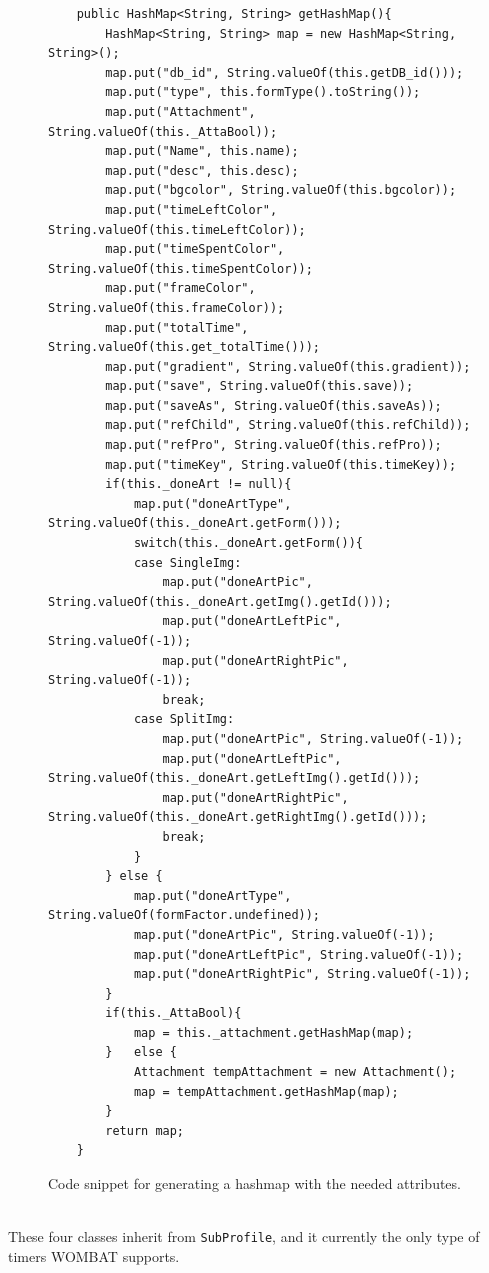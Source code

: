 \begin{description}
	\begin{figure}[H]
\begin{lstlisting}
	public HashMap<String, String> getHashMap(){
		HashMap<String, String> map = new HashMap<String, String>();
		map.put("db_id", String.valueOf(this.getDB_id()));
		map.put("type", this.formType().toString());		
		map.put("Attachment", String.valueOf(this._AttaBool));		
		map.put("Name", this.name);		
		map.put("desc", this.desc);		
		map.put("bgcolor", String.valueOf(this.bgcolor));		
		map.put("timeLeftColor", String.valueOf(this.timeLeftColor));		
		map.put("timeSpentColor", String.valueOf(this.timeSpentColor));		
		map.put("frameColor", String.valueOf(this.frameColor));
		map.put("totalTime", String.valueOf(this.get_totalTime()));		
		map.put("gradient", String.valueOf(this.gradient));		
		map.put("save", String.valueOf(this.save));		
		map.put("saveAs", String.valueOf(this.saveAs));
		map.put("refChild", String.valueOf(this.refChild));		
		map.put("refPro", String.valueOf(this.refPro));
		map.put("timeKey", String.valueOf(this.timeKey));
		if(this._doneArt != null){
			map.put("doneArtType", String.valueOf(this._doneArt.getForm()));
			switch(this._doneArt.getForm()){
			case SingleImg:
				map.put("doneArtPic", String.valueOf(this._doneArt.getImg().getId()));
				map.put("doneArtLeftPic", String.valueOf(-1));
				map.put("doneArtRightPic", String.valueOf(-1));
				break;
			case SplitImg:
				map.put("doneArtPic", String.valueOf(-1));
				map.put("doneArtLeftPic", String.valueOf(this._doneArt.getLeftImg().getId()));
				map.put("doneArtRightPic", String.valueOf(this._doneArt.getRightImg().getId()));
				break;
			}
		} else {
			map.put("doneArtType", String.valueOf(formFactor.undefined));
			map.put("doneArtPic", String.valueOf(-1));
			map.put("doneArtLeftPic", String.valueOf(-1));
			map.put("doneArtRightPic", String.valueOf(-1));
		}
		if(this._AttaBool){
			map = this._attachment.getHashMap(map);				
		}	else {
			Attachment tempAttachment = new Attachment();
			map = tempAttachment.getHashMap(map);
		}
		return map;
	}
\end{lstlisting}
\caption{Code snippet for generating a hashmap with the needed attributes.}%
\label{code:subprofilehashmap}%
\end{figure}
	
	\item[TimeTimer - Hourglass - ProgressBar - DigitalClock] \hfill \\
  These four classes inherit from \texttt{SubProfile}, and it currently the only type of timers WOMBAT supports.
 

\end{description}
